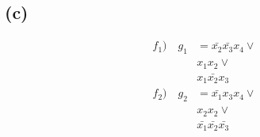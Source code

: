\documentclass[a4paper,
  twoside, %
  headlines=2.1 %
  ]{scrartcl}
\begin{document}
\subsection*{(c)} 
\begin{align*}
	f_1) \quad g_1 &= \bar{x_2}\bar{x_3}x_4 \lor\\
	&x_1 x_2 \lor\\
	&x_1 \bar{x_2} x_3
\end{align*}
\begin{align*}
	f_2) \quad g_2 &= \bar{x_1} x_3 x_4 \lor \\
	&x_2 x_2 \lor \\
	&\bar{x_1} \bar{x_2} \bar{x_3} 
\end{align*}
\end{document}
